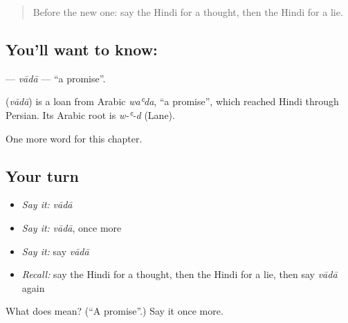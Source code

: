 \label{lesson:HI-C206-vada}



\begin{quote}
Before the new one: say the Hindi for a thought, then the Hindi for a lie.
\end{quote}

\subsection*{You'll want to know: }
\textbf{} — \emph{vādā} — \textquotedblleft{}a promise\textquotedblright{}.

\begin{cousinweb}
\textbf{} (\emph{vādā}) is a loan from Arabic \emph{waʿda}, \textquotedblleft{}a promise\textquotedblright{}, which reached Hindi through Persian. Its Arabic root is \emph{w-ʿ-d} (Lane).
\end{cousinweb}

\begin{grammarlens}[title={What you've built}]
One more word for this chapter.
\end{grammarlens}

\subsection*{Your turn}
\begin{itemize}
\raggedright
  \item \emph{Say it:} \emph{vādā}
  \item \emph{Say it:} \emph{vādā}, once more
  \item \emph{Say it:} say \emph{vādā}
  \item \emph{Recall:} say the Hindi for a thought, then the Hindi for a lie, then say \emph{vādā} again
\end{itemize}

\begin{tcolorbox}[breakable,colback=teal!4,colframe=teal!35!black,title={Before you move on}]
What does  mean? (\textquotedblleft{}A promise\textquotedblright{}.) Say it once more.
\end{tcolorbox}
